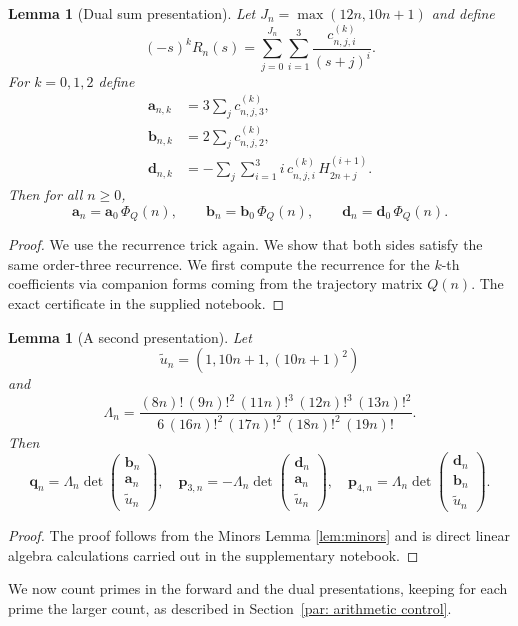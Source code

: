 \documentclass[oneside,english,11pt]{amsart}
\newtheorem{lemma}[thm]{Lemma}
\begin{document}
\begin{lemma}[Dual sum presentation]
\label{lem: dual sum}
Let $J_n=\max(12n,10n+1)$ and define
\[
  (-s)^kR_n(s)
  =\sum_{j=0}^{J_n}\sum_{i=1}^3
    \frac{c^{(k)}_{n,j,i}}{(s+j)^i}.
\]
    For $k=0,1,2$ define
\begin{align*}
  \mathbf a_{n,k}&=3\sum_jc^{(k)}_{n,j,3},\\
  \mathbf b_{n,k}&=2\sum_jc^{(k)}_{n,j,2},\\
  \mathbf d_{n,k}&=-\sum_j\sum_{i=1}^3i\,c^{(k)}_{n,j,i}\,H^{(i+1)}_{2n+j}.
\end{align*}
Then for all $n\ge0$,
\[
  \mathbf a_n=\mathbf a_0\,\Phi_Q(n),\qquad \mathbf b_n=\mathbf b_0\,\Phi_Q(n),\qquad
  \mathbf d_n=\mathbf d_0\,\Phi_Q(n).
\]
\end{lemma}
\begin{proof}
    We use the recurrence trick again. We show that both sides satisfy the same order-three recurrence. We first compute the recurrence for the $k$-th coefficients via companion forms coming from the trajectory matrix $Q(n)$. The exact certificate in the supplied notebook.
\end{proof}


\begin{lemma}[A second presentation]\label{prop:z34-dual}
Let 
\[
\tilde u_n=(1,10n+1,(10n+1)^2)
\]
and 
 \[
  \Lambda_n=\frac{(8n)!\,(9n)!^2\,(11n)!^3\,(12n)!^3\,(13n)!^2}
                 {6\,(16n)!^2\,(17n)!^2\,(18n)!^2\,(19n)!}.
\]
Then
\[
  \mathbf q_n=\Lambda_n\det\begin{pmatrix}\mathbf b_n\\\mathbf a_n\\\tilde u_n\end{pmatrix},\quad
  \mathbf p_{3,n}=-\Lambda_n\det\begin{pmatrix}\mathbf d_n\\\mathbf a_n\\\tilde u_n\end{pmatrix},\quad
  \mathbf p_{4,n}=\Lambda_n\det\begin{pmatrix}\mathbf d_n\\\mathbf b_n\\\tilde u_n\end{pmatrix}.
\]
\end{lemma}
\begin{proof}
The proof follows from the Minors Lemma \ref{lem:minors} and is direct linear algebra calculations carried out in the supplementary notebook.
\end{proof}
%
We now count primes in the forward and the dual presentations, keeping for each prime the larger count, as described in Section~\ref{par: arithmetic control}.
\end{document}
